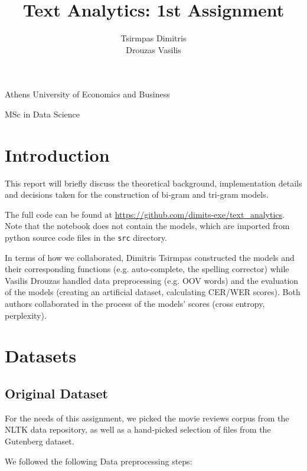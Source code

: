 \documentclass[11pt, a4paper]{article}
\title{\Huge Text Analytics: 1st Assignment}
\author{\LARGE Tsirmpas Dimitris\\\LARGE Drouzas Vasilis}
\begin{document}
	
	\begin{titlepage}
		\maketitle
		\begin{center}
			
			\large Athens University of Economics and Business
			
			\large MSc in Data Science
			
		\end{center}
		
	\end{titlepage}
	
	\tableofcontents
	\newpage	
	
	\section{Introduction}
	
	This report will briefly discuss the theoretical background, implementation details and decisions taken for the construction of bi-gram and tri-gram models.
	
 
	The full code can be found at \url{https://github.com/dimits-exe/text_analytics}. Note that the notebook does not contain the models, which are imported from python source code files in the \texttt{src} directory.

    In terms of how we collaborated, Dimitris Tsirmpas constructed the models and their corresponding functions (e.g. auto-complete, the spelling corrector) while Vasilis Drouzas handled data preprocessing (e.g. OOV words) and the evaluation of the models (creating an artificial dataset, calculating CER/WER scores). Both authors collaborated in the process of the models' scores (cross entropy, perplexity). 
	
	\section{Datasets}
	
	
	\subsection{Original Dataset}
	
	For the needs of this assignment, we picked the movie reviews corpus from the NLTK data repository, as well as a hand-picked selection of files from the Gutenberg dataset. 
	
	We followed the following Data preprocessing steps:
	
\end{document}
